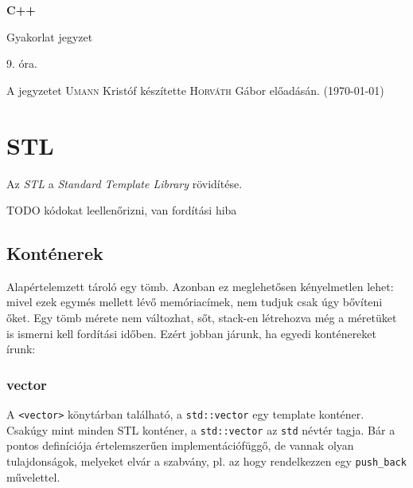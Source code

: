 \documentclass[a4paper,11.5pt]{article}
\begin{document}
	\setlength\parindent{0pt}
	\def\s{\hspace{0.2mm}\vphantom{\beta}}
	\def\Z{\mathbb{Z}}
	\def\Q{\mathbb{Q}}
	\def\R{\mathbb{R}}
	\def\C{\mathbb{C}}
	\def\N{\mathbb{N}}
	\def\Ra{\overline{\mathbb{R}}}
	
	\def\sume{\displaystyle\sum_{n=1}^{+\infty}}
	\def\sumn{\displaystyle\sum_{n=0}^{+\infty}}
	
	\def\narrow{\underset{n\rightarrow+\infty}{\longrightarrow}}
	\def\limn{\displaystyle\lim_{n\to +\infty}}
	\def\limx{\displaystyle\lim_{x\to +\infty}}
	
	\theoremstyle{definition}
	\newtheorem{theorem}{Tétel}[subsection] 
	
	\theoremstyle{definition}
	\newtheorem{definition}[theorem]{Definíció} 
	\newtheorem{example}[theorem]{Példa} 
	\newtheorem{task}[theorem]{Feladat} 
	\newtheorem{note}[theorem]{Megjegyzés}
	\begin{center}
		{\LARGE\textbf{C++}}
		
		{\Large Gyakorlat jegyzet}
		
		9. óra.
	\end{center}
	A jegyzetet \textsc{Umann} Kristóf készítette \textsc{Horváth} Gábor  előadásán. (\today)
	
	\section{STL}

	Az \textit{STL} a \textit{Standard Template Library} rövidítése.
	
	{\LARGE TODO kódokat leellenőrizni, van fordítási hiba}
	\subsection{Konténerek}
	Alapértelemzett tároló egy tömb. Azonban ez meglehetősen kényelmetlen lehet: mivel ezek egymés mellett lévő memóriacímek, nem tudjuk csak úgy bővíteni őket. Egy tömb mérete nem változhat, sőt, stack-en létrehozva még a méretüket is ismerni kell fordítási időben. Ezért jobban járunk, ha egyedi konténereket írunk:
	\subsubsection{vector}
	A \texttt{<vector>} könytárban található, a \texttt{std::vector} egy template konténer. Csakúgy mint minden STL konténer, a \texttt{std::vector} az \texttt{std} névtér tagja. Bár a pontos definíciója értelemszerűen implementációfüggő, de vannak olyan tulajdonságok, melyeket elvár a szabvány, pl. az hogy rendelkezzen egy \texttt{push\_back} művelettel.
	\smallskip
	
\end{document}
